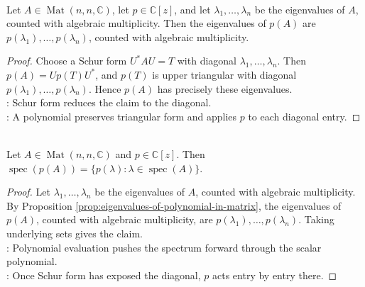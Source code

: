 \begin{proposition} \label{prop:eigenvalues-of-polynomial-in-matrix} \\
Let $A\in\operatorname{Mat}(n,n,\mathbb{C})$, let $p\in\mathbb{C}[z]$, and let $\lambda_1,\ldots,\lambda_n$ be the eigenvalues of $A$, counted with algebraic multiplicity. Then the eigenvalues of $p(A)$ are $p(\lambda_1),\ldots,p(\lambda_n)$, counted with algebraic multiplicity.
\begin{proof}
Choose a Schur form $U^*AU=T$ with diagonal $\lambda_1,\ldots,\lambda_n$. Then $p(A)=Up(T)U^*$, and $p(T)$ is upper triangular with diagonal $p(\lambda_1),\ldots,p(\lambda_n)$. Hence $p(A)$ has precisely these eigenvalues.\\
: Schur form reduces the claim to the diagonal.\\
: A polynomial preserves triangular form and applies $p$ to each diagonal entry.
\end{proof}
\end{proposition}

\begin{corollary} \label{cor:polynomial-spectral-mapping-matrix} \\
Let $A\in\operatorname{Mat}(n,n,\mathbb{C})$ and $p\in\mathbb{C}[z]$. Then $\operatorname{spec}(p(A))=\{p(\lambda):\lambda\in\operatorname{spec}(A)\}$.
\begin{proof}
Let $\lambda_1,\ldots,\lambda_n$ be the eigenvalues of $A$, counted with algebraic multiplicity.\\
By Proposition \ref{prop:eigenvalues-of-polynomial-in-matrix}, the eigenvalues of $p(A)$, counted with algebraic multiplicity, are $p(\lambda_1),\ldots,p(\lambda_n)$. Taking underlying sets gives the claim.\\
: Polynomial evaluation pushes the spectrum forward through the scalar polynomial.\\
: Once Schur form has exposed the diagonal, $p$ acts entry by entry there.
\end{proof}
\end{corollary}

